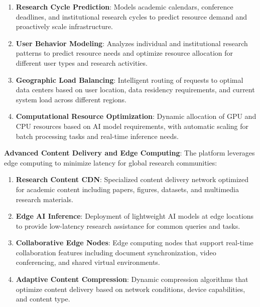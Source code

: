 \documentclass[10pt,twocolumn]{article}
\begin{document}
\begin{enumerate}
    \item \textbf{Research Cycle Prediction}: Models academic calendars, conference deadlines, and institutional research cycles to predict resource demand and proactively scale infrastructure.
    
    \item \textbf{User Behavior Modeling}: Analyzes individual and institutional research patterns to predict resource needs and optimize resource allocation for different user types and research activities.
    
    \item \textbf{Geographic Load Balancing}: Intelligent routing of requests to optimal data centers based on user location, data residency requirements, and current system load across different regions.
    
    \item \textbf{Computational Resource Optimization}: Dynamic allocation of GPU and CPU resources based on AI model requirements, with automatic scaling for batch processing tasks and real-time inference needs.
\end{enumerate}

\textbf{Advanced Content Delivery and Edge Computing}: The platform leverages edge computing to minimize latency for global research communities:

\begin{enumerate}
    \item \textbf{Research Content CDN}: Specialized content delivery network optimized for academic content including papers, figures, datasets, and multimedia research materials.
    
    \item \textbf{Edge AI Inference}: Deployment of lightweight AI models at edge locations to provide low-latency research assistance for common queries and tasks.
    
    \item \textbf{Collaborative Edge Nodes}: Edge computing nodes that support real-time collaboration features including document synchronization, video conferencing, and shared virtual environments.
    
    \item \textbf{Adaptive Content Compression}: Dynamic compression algorithms that optimize content delivery based on network conditions, device capabilities, and content type.
\end{enumerate}
\end{document}
